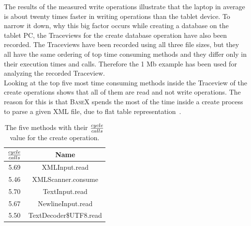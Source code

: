 The results of the measured write operations illustrate that the laptop in average is about twenty times faster in writing operations than the tablet device.
To narrow it down, why this big factor occurs while creating a database on the tablet PC, the Traceviews for the create database operation have also been recorded.
The Traceviews have been recorded using all three file sizes, but they all have the same ordering of top time consuming methods and they differ only in their execution times and calls.
Therefore the 1 Mb example has been used for analyzing the recorded Traceview.\\
Looking at the top five most time consuming methods inside the Traceview of the create operations shows that all of them are read and not write operations.
The reason for this is that \textsc{BaseX} spends the most of the time inside a create process to parse a given XML file, due to flat table representation~\cite{grun2010storing}.

\begin{table}[htpb]
	\centering
	\begin{tabular}{|c|c|}
		\hline
		${cycle \over calls}$&Name\\[0.9ex]
		\hline
		5.69&XMLInput.read\\
		\hline
		5.46&XMLScanner.consume\\
		\hline
		5.70&TextInput.read\\
		\hline
		5.67&NewlineInput.read\\
		\hline
		5.50&TextDecoder\$UTF8.read\\
		\hline
	\end{tabular}
	\caption{The five methods with their ${cycle \over calls}$ value for the create operation.}
	\label{tab:top-five-cycle-call-write}
\end{table}

